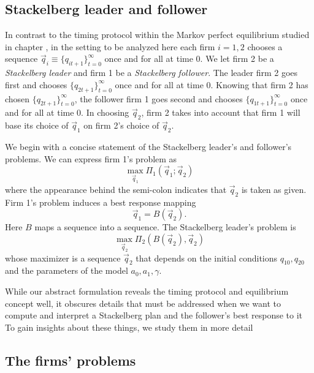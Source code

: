 \subsection{Stackelberg leader and follower}
In contrast to the timing protocol within the Markov perfect equilibrium studied in chapter , in the setting to be analyzed here
each firm $i=1,2$ chooses a sequence $\vec q_i \equiv \{q_{it+1}\}_{t=0}^\infty$ once and for all at time $0$.
We  let firm 2 be a {\it Stackelberg leader\/} and firm 1 be a {\it Stackelberg follower}.
The leader firm 2 goes first and chooses $\{q_{2t+1}\}_{t=0}^\infty$  once and for all at time $0$.
Knowing that firm 2 has chosen $\{q_{2t+1}\}_{t=0}^\infty$, the follower firm 1 goes second and chooses $\{q_{1t+1}\}_{t=0}^\infty$  once and for all at time $0$.
In choosing $\vec q_2$, firm 2 takes into account that firm 1 will base its choice of
$\vec q_1$ on firm 2's choice of $\vec q_2$.



We begin with a concise  statement of the Stackelberg leader's and follower's problems.
We can express firm 1's problem as
$$ \max_{\vec q_1} \Pi_1(\vec q_1; \vec q_2)  $$
where the appearance behind the semi-colon indicates that  $\vec q_2$ is taken as given.
Firm 1's problem induces a best response mapping
$$ \vec q_1 = B(\vec q_2). $$
Here $B$ maps a sequence into a sequence.
The Stackelberg leader's problem is
$$ \max_{\vec q_2} \Pi_2 (B(\vec q_2), \vec q_2) $$
whose maximizer is a sequence $\vec q_2$ that depends on the initial conditions $q_{10}, q_{20}$ and the parameters of
the model $a_0, a_1, \gamma$.


While our abstract formulation reveals the timing protocol and equilibrium concept well, it obscures details
that must be addressed when we want to compute and interpret a Stackelberg plan and the follower's best response to it
To gain insights about these things, we study them in more detail

\subsection{The   firms' problems}


